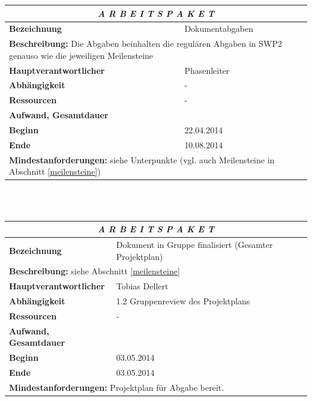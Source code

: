\documentclass[fontsize=12pt,paper=a4,twoside]{scrartcl}
\begin{document}
\begin{tabular}{p{7.5cm}|p{7.5cm}}\toprule
\multicolumn{2}{c}{\textbf{\textit{A R B E I T S P A K E T \quad 6}}} \\ \toprule \hline
\textbf{Bezeichnung} & Dokumentabgaben\\\hline
\multicolumn{2}{p{15cm}}{\textbf{Beschreibung:} \newline 
Die Abgaben beinhalten die regulären Abgaben in SWP2 genauso wie die jeweiligen Meilensteine}  \\\hline
\textbf{Hauptverantwortlicher} & Phasenleiter \\\hline
\textbf{Abhängigkeit} & -\\\hline
\textbf{Ressourcen} & -\\\hline
\textbf{Aufwand, Gesamtdauer} & \\\hline
\textbf{Beginn} & 22.04.2014 \\\hline
\textbf{Ende} & 10.08.2014\\\hline
\multicolumn{2}{p{15cm}}{\textbf{Mindestanforderungen: } \newline
siehe Unterpunkte (vgl. auch Meilensteine in Abschnitt \ref{meilensteine})}  \\ \toprule
\end{tabular} \\\\

\begin{tabular}{p{7.5cm}|p{7.5cm}}\toprule
\multicolumn{2}{c}{\textbf{\textit{A R B E I T S P A K E T \quad 6.1}}} \\ \toprule \hline
\textbf{Bezeichnung} & Dokument in Gruppe finalisiert (Gesamter Projektplan)\\\hline
\multicolumn{2}{p{15cm}}{\textbf{Beschreibung:} \newline 
siehe Abschnitt \ref{meilensteine} }  \\\hline
\textbf{Hauptverantwortlicher} & Tobias Dellert \\\hline
\textbf{Abhängigkeit} & 1.2 Gruppenreview des Projektplans\\\hline
\textbf{Ressourcen} & -\\\hline
\textbf{Aufwand, Gesamtdauer} & \\\hline
\textbf{Beginn} & 03.05.2014 \\\hline
\textbf{Ende} & 03.05.2014\\\hline
\multicolumn{2}{p{15cm}}{\textbf{Mindestanforderungen: } \newline
Projektplan für Abgabe bereit.}  \\ \toprule
\end{tabular} \\\\
\end{document}
